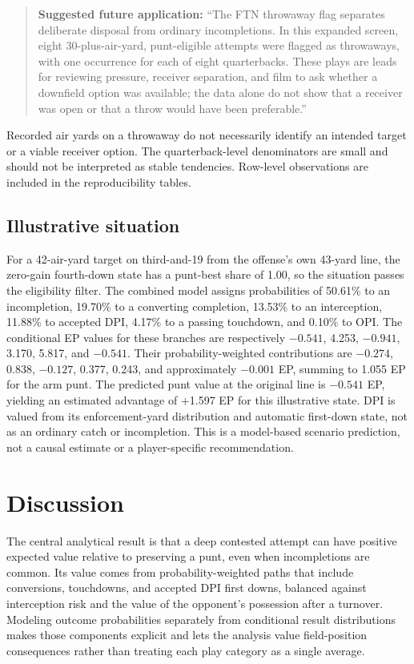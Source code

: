 \documentclass[11pt]{article}
\begin{document}
\begin{quote}
\textbf{Suggested future application:} ``The FTN throwaway flag separates deliberate disposal from ordinary incompletions. In this expanded screen, eight 30-plus-air-yard, punt-eligible attempts were flagged as throwaways, with one occurrence for each of eight quarterbacks. These plays are leads for reviewing pressure, receiver separation, and film to ask whether a downfield option was available; the data alone do not show that a receiver was open or that a throw would have been preferable.''
\end{quote}

Recorded air yards on a throwaway do not necessarily identify an intended target or a viable receiver option. The quarterback-level denominators are small and should not be interpreted as stable tendencies. Row-level observations are included in the reproducibility tables.

\subsection{Illustrative situation}

For a 42-air-yard target on third-and-19 from the offense's own 43-yard line, the zero-gain fourth-down state has a punt-best share of 1.00, so the situation passes the eligibility filter. The combined model assigns probabilities of 50.61\% to an incompletion, 19.70\% to a converting completion, 13.53\% to an interception, 11.88\% to accepted DPI, 4.17\% to a passing touchdown, and 0.10\% to OPI. The conditional EP values for these branches are respectively $-0.541$, 4.253, $-0.941$, 3.170, 5.817, and $-0.541$. Their probability-weighted contributions are $-0.274$, 0.838, $-0.127$, 0.377, 0.243, and approximately $-0.001$ EP, summing to 1.055 EP for the arm punt. The predicted punt value at the original line is $-0.541$ EP, yielding an estimated advantage of +1.597 EP for this illustrative state. DPI is valued from its enforcement-yard distribution and automatic first-down state, not as an ordinary catch or incompletion. This is a model-based scenario prediction, not a causal estimate or a player-specific recommendation.

\section{Discussion}

The central analytical result is that a deep contested attempt can have positive expected value relative to preserving a punt, even when incompletions are common. Its value comes from probability-weighted paths that include conversions, touchdowns, and accepted DPI first downs, balanced against interception risk and the value of the opponent's possession after a turnover. Modeling outcome probabilities separately from conditional result distributions makes those components explicit and lets the analysis value field-position consequences rather than treating each play category as a single average.
\end{document}
